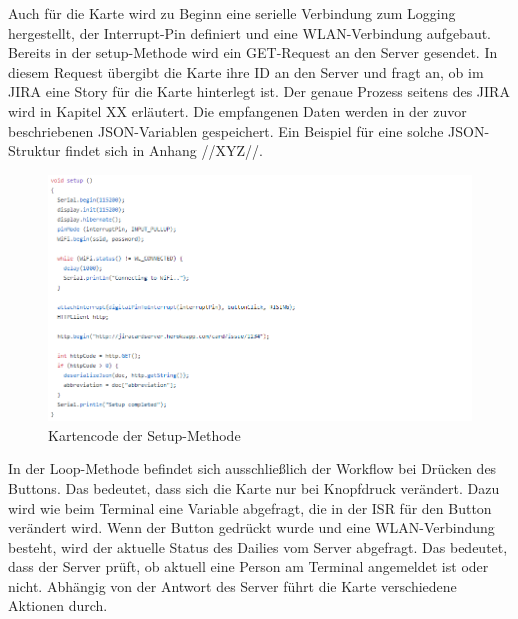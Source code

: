 \documentclass[12pt,titlepage]{scrartcl}
\begin{document}
		\noindent Auch für die Karte wird zu Beginn eine serielle Verbindung zum Logging hergestellt, der Interrupt-Pin definiert und eine WLAN-Verbindung aufgebaut. Bereits in der setup-Methode wird ein GET-Request an den Server gesendet. In diesem Request übergibt die Karte ihre ID an den Server und fragt an, ob im JIRA eine Story für die Karte hinterlegt ist. Der genaue Prozess seitens des JIRA wird in Kapitel XX erläutert. Die empfangenen Daten werden in der zuvor beschriebenen JSON-Variablen gespeichert. Ein Beispiel für eine solche JSON-Struktur findet sich in Anhang //XYZ//. \\
		\begin{figure}[H] 
  			\centering
    		\includegraphics[height=0.5\textheight]{storySetup}
  			\caption{Kartencode der Setup-Methode}
  			\label{fig:storySetup}
		\end{figure}
		\noindent In der Loop-Methode befindet sich ausschließlich der Workflow bei Drücken des Buttons. Das bedeutet, dass sich die Karte nur bei Knopfdruck verändert. Dazu wird wie beim Terminal eine Variable abgefragt, die in der ISR für den Button verändert wird. Wenn der Button gedrückt wurde und eine WLAN-Verbindung besteht, wird der aktuelle Status des Dailies vom Server abgefragt. Das bedeutet, dass der Server prüft, ob aktuell eine Person am Terminal angemeldet ist oder nicht. Abhängig von der Antwort des Server führt die Karte verschiedene Aktionen durch. \\
\end{document}
